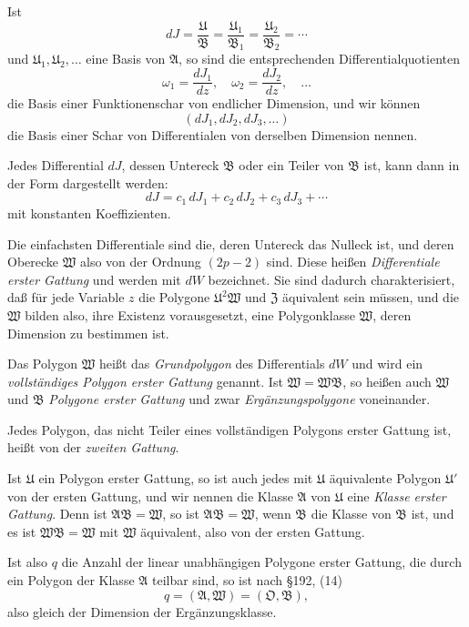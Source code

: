 \documentclass[12pt,a4paper]{article}
\begin{document}
Ist
\[
dJ = \frac{\mathfrak{U}}{\mathfrak{B}} = \frac{\mathfrak{U}_1}{\mathfrak{B}_1} = \frac{\mathfrak{U}_2}{\mathfrak{B}_2} = \cdots
\]
und $\mathfrak{U}_1, \mathfrak{U}_2, \ldots$ eine Basis von $\mathfrak{A}$, so sind die entsprechenden Differentialquotienten
\[
\omega_1 = \frac{dJ_1}{dz}, \quad \omega_2 = \frac{dJ_2}{dz}, \quad \ldots
\]
die Basis einer Funktionenschar von endlicher Dimension, und wir können
\[
(dJ_1, dJ_2, dJ_3, \ldots)
\]
die Basis einer Schar von Differentialen von derselben Dimension nennen.

Jedes Differential $dJ$, dessen Untereck $\mathfrak{B}$ oder ein Teiler von $\mathfrak{B}$ ist, kann dann in der Form dargestellt werden:
\begin{equation}\label{eq:197-7}
dJ = c_1\,dJ_1 + c_2\,dJ_2 + c_3\,dJ_3 + \cdots
\end{equation}
mit konstanten Koeffizienten.

Die einfachsten Differentiale sind die, deren Untereck das Nulleck ist, und deren Oberecke $\mathfrak{W}$ also von der Ordnung $(2p-2)$ sind. Diese heißen \emph{Differentiale erster Gattung} und werden mit $dW$ bezeichnet. Sie sind dadurch charakterisiert, daß für jede Variable $z$ die Polygone $\mathfrak{U}^2 \mathfrak{W}$ und $\mathfrak{Z}$ äquivalent sein müssen, und die $\mathfrak{W}$ bilden also, ihre Existenz vorausgesetzt, eine Polygonklasse $\mathfrak{W}$, deren Dimension zu bestimmen ist.

Das Polygon $\mathfrak{W}$ heißt das \emph{Grundpolygon} des Differentials $dW$ und wird ein \emph{vollständiges Polygon erster Gattung} genannt. Ist $\mathfrak{W} = \mathfrak{W}\mathfrak{B}$, so heißen auch $\mathfrak{W}$ und $\mathfrak{B}$ \emph{Polygone erster Gattung} und zwar \emph{Ergänzungspolygone} voneinander.

Jedes Polygon, das nicht Teiler eines vollständigen Polygons erster Gattung ist, heißt von der \emph{zweiten Gattung}.

Ist $\mathfrak{U}$ ein Polygon erster Gattung, so ist auch jedes mit $\mathfrak{U}$ äquivalente Polygon $\mathfrak{U}'$ von der ersten Gattung, und wir nennen die Klasse $\mathfrak{A}$ von $\mathfrak{U}$ eine \emph{Klasse erster Gattung}. Denn ist $\mathfrak{A}\mathfrak{B} = \mathfrak{W}$, so ist $\mathfrak{A}\mathfrak{B} = \mathfrak{W}$, wenn $\mathfrak{B}$ die Klasse von $\mathfrak{B}$ ist, und es ist $\mathfrak{W}\mathfrak{B} = \mathfrak{W}$ mit $\mathfrak{W}$ äquivalent, also von der ersten Gattung.

Ist also $q$ die Anzahl der linear unabhängigen Polygone erster Gattung, die durch ein Polygon der Klasse $\mathfrak{A}$ teilbar sind, so ist nach \S 192, (14)
\begin{equation}\label{eq:197-8}
q = (\mathfrak{A}, \mathfrak{W}) = (\mathfrak{O}, \mathfrak{B}),
\end{equation}
also gleich der Dimension der Ergänzungsklasse.
\end{document}
